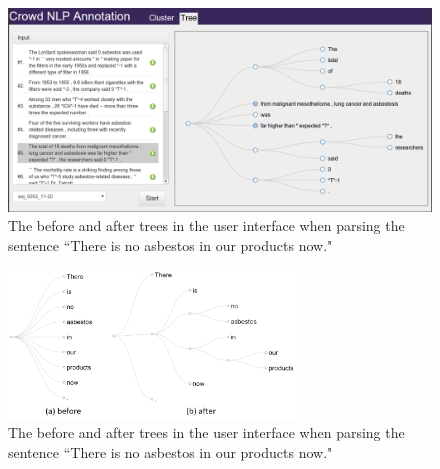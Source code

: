 \begin{figure}
\centering
\includegraphics[width=6.1in]{figs/interface-tree.png}
\caption{The before and after trees in the user interface when parsing
the sentence {``There is no asbestos in our products now."}}
\label{fig:interface_tree.png}
\end{figure}



\begin{figure}
\centering
\includegraphics[width=3in]{figs/overview_tree_editing.png}
\caption{The before and after trees in the user interface when parsing
the sentence {``There is no asbestos in our products now."}}
\label{fig:interface2.png}
\end{figure}


